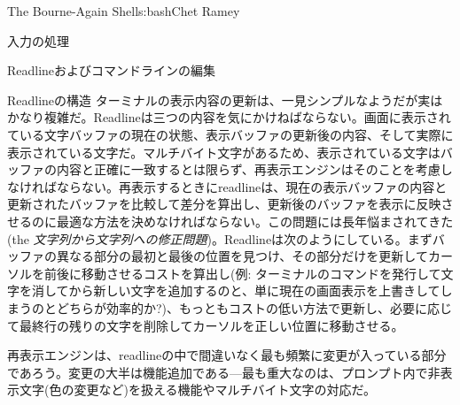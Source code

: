 \begin{aosachapter}{The Bourne-Again Shell}{s:bash}{Chet Ramey}
\begin{aosasect1}{入力の処理}
\begin{aosasect2}{Readlineおよびコマンドラインの編集}
\begin{aosasect3}{Readlineの構造}
ターミナルの表示内容の更新は、一見シンプルなようだが実はかなり複雑だ。Readlineは三つの内容を気にかけねばならない。画面に表示されている文字バッファの現在の状態、表示バッファの更新後の内容、そして実際に表示されている文字だ。マルチバイト文字があるため、表示されている文字はバッファの内容と正確に一致するとは限らず、再表示エンジンはそのことを考慮しなければならない。再表示するときにreadlineは、現在の表示バッファの内容と更新されたバッファを比較して差分を算出し、更新後のバッファを表示に反映させるのに最適な方法を決めなければならない。この問題には長年悩まされてきた(the \emph{文字列から文字列への修正問題})。Readlineは次のようにしている。まずバッファの異なる部分の最初と最後の位置を見つけ、その部分だけを更新してカーソルを前後に移動させるコストを算出し(例: ターミナルのコマンドを発行して文字を消してから新しい文字を追加するのと、単に現在の画面表示を上書きしてしまうのとどちらが効率的か?)、もっともコストの低い方法で更新し、必要に応じて最終行の残りの文字を削除してカーソルを正しい位置に移動させる。

再表示エンジンは、readlineの中で間違いなく最も頻繁に変更が入っている部分であろう。変更の大半は機能追加である---最も重大なのは、プロンプト内で非表示文字(色の変更など)を扱える機能やマルチバイト文字の対応だ。


\end{aosasect3}
\end{aosasect2}
\end{aosasect1}
\end{aosachapter}
